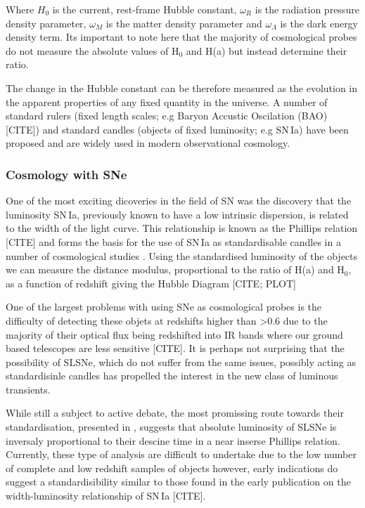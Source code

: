 \noindent Where $H_0$ is the current, rest-frame Hubble constant, $\omega_{R}$ is the radiation pressure density parameter, $\omega_{M}$ is the matter density parameter and $\omega_{\Lambda}$ is the dark energy density term. Its important to note here that the majority of cosmological probes do not measure the absolute values of H$_{0}$ and H(a) but instead determine their ratio.

The change in the Hubble constant can be therefore measured as the evolution in the apparent properties of any fixed quantity in the universe. A number of standard rulers (fixed length scales; e.g Baryon Accustic Oscilation (BAO) [CITE]) and standard candles (objects of fixed luminosity; e.g SN\,Ia) have been proposed and are widely used in modern observational cosmology.

\subsubsection{Cosmology with SNe}
One of the most exciting dicoveries in the field of SN was the discovery that the luminosity SN\,Ia, previously known to have a low intrinsic dispersion, is related to the width of the light curve. This relationship is known as the Phillips relation [CITE] and forms the basis for the use of SN\,Ia as standardisable candles in a number of cosmological studies \citep{Betulle}. Using the standardised luminosity of the objects we can measure the distance modulus, proportional to the ratio of H(a) and H$_0$, as a function of redshift giving the Hubble Diagram [CITE; PLOT]

One of the largest problems with using SNe as cosmological probes is the difficulty of detecting these objets at redshifts higher than >0.6 due to the majority of their optical flux being redshifted into IR bands where our ground based telescopes are less sensitive [CITE]. It is perhaps not surprising that the possibility of SLSNe, which do not suffer from the same issues, possibly acting as standardisinle candles \citep{Inserra2014,Papadopoulus2015,Inserra2018a} has propelled the interest in the new class of luminous transients.

While still a subject to active debate, the most promissing route towards their standardisation, presented in \citet{Inserra2018a}, suggests that absolute luminosity of SLSNe is inversaly proportional to their descine time in a near inserse Phillips relation. Currently, these type of analysis are difficult to undertake due to the low number of complete and low redshift samples of objects however, early indications do suggest a standardisibility similar to those found in the early publication on the width-luminosity relationship of SN\,Ia [CITE].


